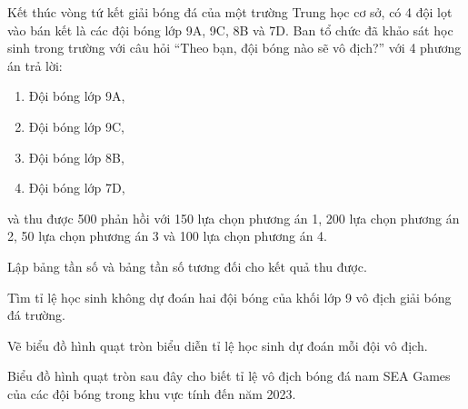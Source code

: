 \begin{practice}
    \begin{questions}[resume=SBT]
        \item Kết thúc vòng tứ kết giải bóng đá của một trường Trung học cơ sở, có 4 đội lọt vào bán kết là các đội bóng lớp 9A, 9C, 8B và 7D. Ban tổ chức đã khảo sát học sinh trong trường với câu hỏi “Theo bạn, đội bóng nào sẽ vô địch?” với 4 phương án trả lời:
        \begin{enumerate}[label=\arabic*.]
            \item Đội bóng lớp 9A,
            \item Đội bóng lớp 9C,
            \item Đội bóng lớp 8B,
            \item Đội bóng lớp 7D,
        \end{enumerate}
        và thu được 500 phản hồi với 150 lựa chọn phương án 1, 200 lựa chọn phương án 2, 50 lựa chọn phương án 3 và 100 lựa chọn phương án 4.

        \begin{questions}
            \item Lập bảng tần số và bảng tần số tương đối cho kết quả thu được.

            \answerline
            \answerline
            \answerline

            \item Tìm tỉ lệ học sinh không dự đoán hai đội bóng của khối lớp 9 vô địch giải bóng đá trường.

            \answerline
            \answerline

            \item Vẽ biểu đồ hình quạt tròn biểu diễn tỉ lệ học sinh dự đoán mỗi đội vô địch.

            \answerline
            \answerline
            \answerline
        \end{questions}

        \item Biểu đồ hình quạt tròn sau đây cho biết tỉ lệ vô địch bóng đá nam SEA Games của các đội bóng trong khu vực tính đến năm 2023.

        \begin{center}
\end{center}
\end{questions}
\end{practice}
